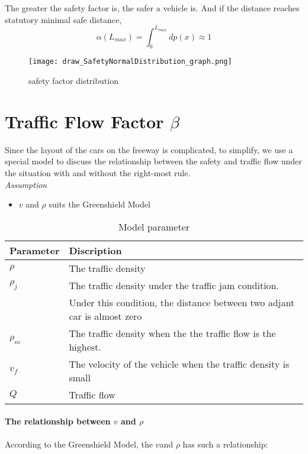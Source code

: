 The greater the safety factor is, the safer a vehicle is. 
And if the distance reaches statutory minimal safe distance, 
\begin{equation}
\alpha(L_{max}) = \int_{0}^{L_{max}}dp(x) \approx 1
\end{equation}


\begin{figure}[h]
\small
\centering
\texttt{[image: draw\_SafetyNormalDistribution\_graph.png]}
\caption{safety factor distribution} \label{fig: safety factor distribution}
\end{figure}




\section{Traffic Flow Factor $ \beta $}
\label{sec: Traffic Flow Factor}

Since the layout of the cars on the freeway is complicated, 
to simplify, we use a special model to discuss the 
relationship between the safety and traffic flow under the 
situation with and without the right-most rule.
\\
\emph{Assumption}
\begin{itemize}
\item $v$ and $\rho$ suits the Greenshield Model
\end{itemize}

\begin{table}
\centering
\begin{tabular}{ll}
\hline
Parameter & Discription\\
\hline
$\rho $ & The traffic density\\
$\rho_j$ & The traffic density under the traffic jam condition. \\
&Under this condition, the distance between two adjant car is almost zero\\
$\rho_m$ & The traffic density when the the traffic flow is the highest.\\
$v_f$ & The velocity of the vehicle when the traffic density is small \\
$Q$ & Traffic flow \\
\hline
\end{tabular}
\caption{Model parameter}
\end{table}


\paragraph{The relationship between $v$ and $\rho$ }
According to the Greenshield Model, the $v $and $\rho$ has such a 
relationship:

